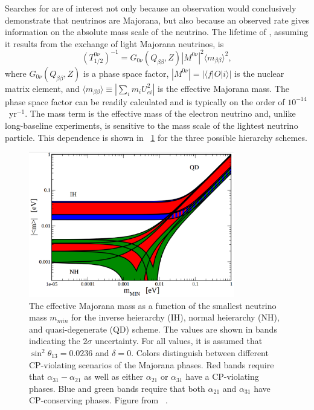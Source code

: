 Searches for \zvbb are of interest not only because an observation would conclusively demonstrate that neutrinos are Majorana, but also because an observed rate gives information on the absolute mass scale of the neutrino.  The lifetime of \zvbb, assuming it results from the exchange of light Majorana neutrinos, is 
\begin{equation}
(T^{0\nu}_{1/2})^{-1} = G_{0\nu}(Q_{\beta\beta},Z)|M^{0\nu}|^2 {\langle}m_{\beta\beta}{\rangle}^2,
\end{equation}
where $G_{0\nu}(Q_{\beta\beta},Z)$ is a phase space factor, $|M^{0\nu}| = |{\langle}f|O|i{\rangle}|$ is the nuclear matrix element, and $\displaystyle {\langle}m_{\beta\beta}{\rangle} \equiv |\sum_{i}m_i U_{ei}^2|$ is the effective Majorana mass.  The phase space factor can be readily calculated \cite{hadron_zvbb_Suhonen} and is typically on the order of $10^{-14}$~yr$^{-1}$.  The mass term is the effective mass of the electron neutrino and, unlike long-baseline experiments, is sensitive to the mass scale of the lightest neutrino particle.  This dependence is shown in {\fig}~\ref{fig:effectiveMajoranaMass} for the three possible hierarchy schemes.  
\begin{figure}[htp]
\centering
\includegraphics[width=0.8\textwidth]{figures/effectiveMajoranaMass.eps}
\caption{The effective Majorana mass as a function of the smallest neutrino mass $m_{min}$ for the inverse heierarchy (IH), normal heierarchy (NH), and quasi-degenerate (QD) scheme.  The values are shown in bands indicating the $2\sigma$ uncertainty.  For all values, it is assumed that $\sin^2{\theta}_{13} = 0.0236$ and $\delta = 0$.  Colors distinguish between different CP-violating scenarios of the Majorana phases.  Red bands require that $\alpha_{31}-\alpha_{21}$ as well as either $\alpha_{21}$ or $\alpha_{31}$ have a CP-violating phases.  Blue and green bands require that both $\alpha_{21}$ and $\alpha_{31}$ have CP-conserving phases.  Figure from {}~\cite{PDG}.}
\label{fig:effectiveMajoranaMass}
\end{figure}

